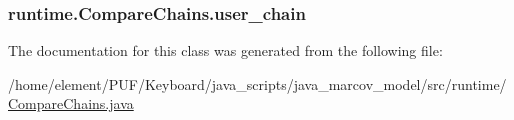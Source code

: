 \subsubsection[{\texorpdfstring{user\+\_\+chain}{user_chain}}]{ runtime.\+Compare\+Chains.\+user\+\_\+chain\hspace{0.3cm}{\ttfamily [protected]}}\hypertarget{classruntime_1_1_compare_chains_ab222c09ed48638554987292979ede005}{}\label{classruntime_1_1_compare_chains_ab222c09ed48638554987292979ede005}


The documentation for this class was generated from the following file\+:\begin{DoxyCompactItemize}
\item 
/home/element/\+P\+U\+F/\+Keyboard/java\+\_\+scripts/java\+\_\+marcov\+\_\+model/src/runtime/\hyperlink{_compare_chains_8java}{Compare\+Chains.\+java}\end{DoxyCompactItemize}
